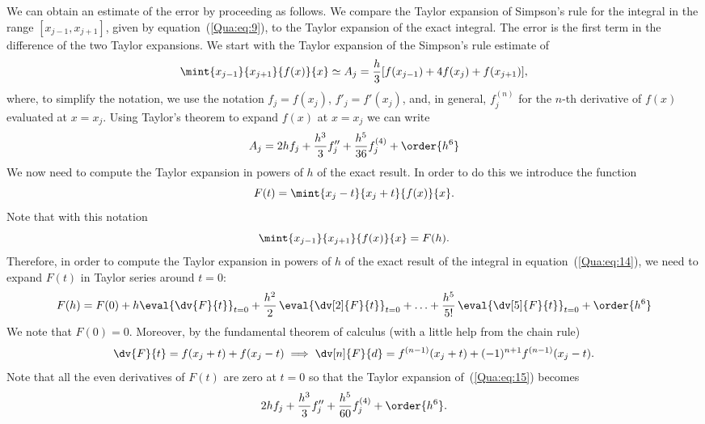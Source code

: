 We can obtain an estimate of the error by proceeding as follows.  We
compare the Taylor expansion of Simpson's rule for the integral in the
range $[x_{j-1},x_{j+1}]$, given by equation~(\ref{Qua:eq:9}), to the
Taylor expansion of the exact integral.  The error is the first term
in the difference of the two Taylor expansions.  We start with the
Taylor expansion of the Simpson's rule estimate of
%
\begin{equation}
  \mint{x_{j-1}}{x_{j+1}}{f(x)}{x} \simeq A_j =
  \frac{h}{3} [ f(x_{j-1}) + 4 f(x_{j}) + f(x_{j+1}) ] ,
  \label{Qua:eq:19}
\end{equation}
%
where, to simplify the notation, we use the notation $f_j=f(x_j)$,
$f'_j=f'(x_j)$, and, in general, $f^{(n)}_j$ for the $n$-th derivative
of $f(x)$ evaluated at $x=x_j$.  Using Taylor's theorem to expand
$f(x)$ at $x=x_j$ we can write
%
\begin{equation}
  A_j = 2 h f_j + \frac{h^3}{3} f_j'' + \frac{h^5}{36} f_j^{(4)} + \order{h^6}
  \label{Qua:eq:20}
\end{equation}
%
We now need to compute the Taylor expansion in powers of $h$ of the
exact result.  In order to do this we introduce the function
%
\begin{equation}
  F(t) = \mint{x_j-t}{x_j+t}{f(x)}{x} .
  \label{Qua:eq:21}
\end{equation}
%
Note that with this notation
%
\begin{equation}
  \mint{x_{j-1}}{x_{j+1}}{f(x)}{x} = F(h).
  \label{Qua:eq:14}
\end{equation}
%
Therefore, in order to compute the Taylor expansion in powers of $h$
of the exact result of the integral in equation~(\ref{Qua:eq:14}), we
need to expand $F(t)$ in Taylor series around $t=0$:
%
\begin{equation}
  F(h) = F(0) +
  h \eval{\dv{F}{t}}_{t=0}  +
  \frac{h^2}{2} \, \eval{\dv[2]{F}{t}}_{t=0}  +
  \ldots +
  \frac{h^5}{5!} \, \eval{\dv[5]{F}{t}}_{t=0} +
  \order{h^6}
  \label{Qua:eq:15}
\end{equation}
%
We note that $F(0)=0$.  Moreover, by the fundamental theorem of
calculus (with a little help from the chain rule)
%
\begin{equation*}
  \dv{F}{t} = f(x_j+t) + f(x_j-t) \implies
  \dv[n]{F}{d} = f^{(n-1)}(x_j+t) +
  (-1)^{n+1} f^{(n-1)}(x_j-t) .
\end{equation*}
%
Note that all the even derivatives of $F(t)$ are zero at $t=0$ so that
the Taylor expansion of~(\ref{Qua:eq:15}) becomes
%
\begin{equation}
  2 h f_j + \frac{h^3}{3} f_j'' + \frac{h^5}{60} f_j^{(4)} + \order{h^6}.
  \label{Qua:eq:30}
\end{equation}

